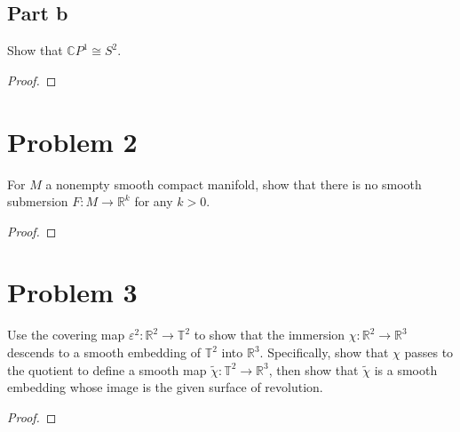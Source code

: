 \documentclass[fontsize=11pt]{scrartcl} %
\numberwithin{equation}{section} %
\numberwithin{figure}{section} %
\numberwithin{table}{section} %
\newcommand{\R}{\mathbb{R}}
\newcommand{\C}{\mathbb{C}}
\begin{document}
\subsection*{Part b}
Show that $\C P^1 \cong S^2$.
\\
\begin{proof}

\end{proof}
\section*{Problem 2} %
For $M$ a nonempty smooth compact manifold, show that there is no
smooth submersion $F:M\to\R^k$ for any $k>0$.
\\
\begin{proof}

\end{proof}
\section*{Problem 3} %
Use the covering map $\varepsilon^2:\R^2\to\mathbb{T}^2$ to show that the immersion $\chi:\R^2\to\R^3$
descends to a smooth embedding of $\mathbb{T}^2$ into $\R^3$. Specifically, show that $\chi$
passes to the quotient to define a smooth map $\tilde{\chi}:\mathbb{T}^2\to\R^3$, then show
that $\tilde{\chi}$ is a smooth embedding whose image is the given surface of revolution.
\\
\begin{proof}

\end{proof}


\end{document}
